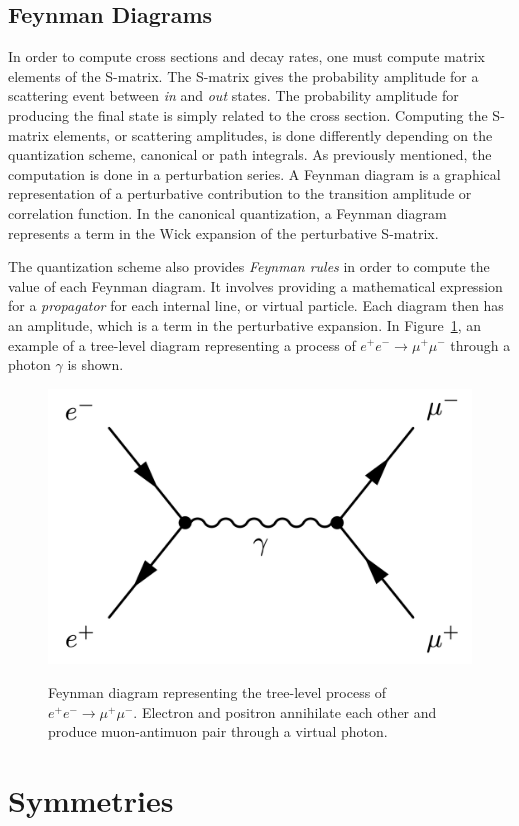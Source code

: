 \subsection{Feynman Diagrams}

In order to compute cross sections and decay rates, one must compute matrix elements of the S-matrix. The S-matrix gives the probability amplitude for a scattering event between \emph{in} and \emph{out} states. The probability amplitude for producing the final state is simply related to the cross section. Computing the S-matrix elements, or scattering amplitudes, is done differently depending on the quantization scheme, canonical or path integrals. As previously mentioned, the computation is done in a perturbation series. A Feynman diagram is a graphical representation of a perturbative contribution to the transition amplitude or correlation function. In the canonical quantization, a Feynman diagram represents a term in the Wick expansion of the perturbative S-matrix. 

The quantization scheme also provides \emph{Feynman rules} in order to compute the value of each Feynman diagram. It involves providing a mathematical expression for a \emph{propagator} for each internal line, or virtual particle. Each diagram then has an amplitude, which is a term in the perturbative expansion. In Figure~\ref{fig:e-to-mu-feynman}, an example of a tree-level diagram representing a process of $e^+ e^- \rightarrow \mu^+ \mu^-$ through a photon $\gamma$ is shown.

\begin{figure}[!htb]
\centering
\includegraphics[width=0.5\linewidth]{plots/feynman_diagrams/feynman_e_to_mu.png}  \\
\caption[Electrons to Muons Feynman diagram]{Feynman diagram representing the tree-level process of $e^+ e^- \rightarrow \mu^+ \mu^-$. Electron and positron annihilate each other and produce muon-antimuon pair through a virtual photon.}
\label{fig:e-to-mu-feynman}
\end{figure}

\clearpage
\section{Symmetries}

